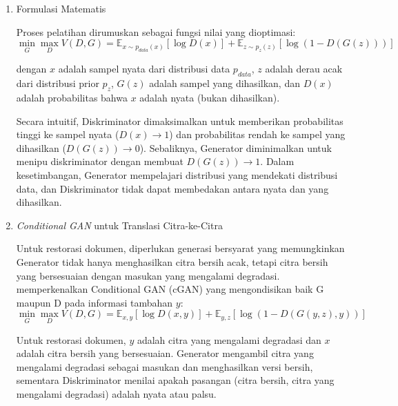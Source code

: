 \documentclass[12pt,a4paper]{article}
\begin{document}
\begin{enumerate}[leftmargin=*, labelindent=0pt, itemsep=1ex, topsep=0pt]

\item Formulasi Matematis
\label{para:gan-formulasi}

Proses pelatihan dirumuskan sebagai fungsi nilai yang dioptimasi:
\begin{equation}
      \min_G \max_D V(D, G) = \mathbb{E}_{x \sim p_{data}(x)}[\log D(x)] + \mathbb{E}_{z \sim p_z(z)}[\log(1 - D(G(z)))]
\end{equation}

dengan $x$ adalah sampel nyata dari distribusi data $p_{data}$, $z$ adalah derau acak dari distribusi prior $p_z$, $G(z)$ adalah sampel yang dihasilkan, dan $D(x)$ adalah probabilitas bahwa $x$ adalah nyata (bukan dihasilkan).

Secara intuitif, Diskriminator dimaksimalkan untuk memberikan probabilitas tinggi ke sampel nyata ($D(x) \to 1$) dan probabilitas rendah ke sampel yang dihasilkan ($D(G(z)) \to 0$). Sebaliknya, Generator diminimalkan untuk menipu diskriminator dengan membuat $D(G(z)) \to 1$. Dalam kesetimbangan, Generator mempelajari distribusi yang mendekati distribusi data, dan Diskriminator tidak dapat membedakan antara nyata dan yang dihasilkan.

\item \textit{Conditional GAN} untuk Translasi Citra-ke-Citra
\label{para:conditional-gan}

Untuk restorasi dokumen, diperlukan generasi bersyarat yang memungkinkan Generator tidak hanya menghasilkan citra bersih acak, tetapi citra bersih yang bersesuaian dengan masukan yang mengalami degradasi. \parencite{mirza2014} memperkenalkan Conditional GAN (cGAN) yang mengondisikan baik G maupun D pada informasi tambahan $y$:
\begin{equation}
      \min_G \max_D V(D, G) = \mathbb{E}_{x, y}[\log D(x, y)] + \mathbb{E}_{y, z}[\log(1 - D(G(y, z), y))]
\end{equation}

Untuk restorasi dokumen, $y$ adalah citra yang mengalami degradasi dan $x$ adalah citra bersih yang bersesuaian. Generator mengambil citra yang mengalami degradasi sebagai masukan dan menghasilkan versi bersih, sementara Diskriminator menilai apakah pasangan (citra bersih, citra yang mengalami degradasi) adalah nyata atau palsu.

\end{enumerate}
\end{document}
